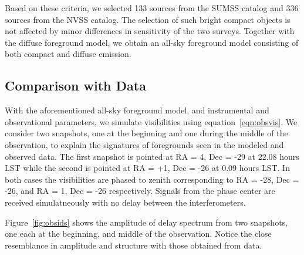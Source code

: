 \documentclass[preprint2,iop,numberedappendix]{emulateapj}
\begin{document}
Based on these criteria, we selected 133 sources from the SUMSS catalog and 336 sources from the NVSS catalog. The selection of such bright compact objects is not affected by minor differences in sensitivity of the two surveys. Together with the diffuse foreground model, we obtain an all-sky foreground model consisting of both compact and diffuse emission.

\subsection{Comparison with Data}\label{sec:data-vs-model}

With the aforementioned all-sky foreground model, and instrumental and observational parameters, we simulate visibilities using equation~\ref{eqn:obsvis}. We consider two snapshots, one at the beginning and one during the middle of the observation, to explain the signatures of foregrounds seen in the modeled and observed data. The first snapshot is pointed at RA = 4, Dec = -29 at 22.08 hours LST while the second is pointed at RA = +1, Dec = -26 at 0.09 hours LST. In both cases the visibilities are phased to zenith corresponding to RA = -28, Dec = -26, and RA = 1, Dec = -26 respectively. Signals from the phase center are received simulatneously with no delay between the interferometers. 

Figure~\ref{fig:obsids} shows the amplitude of delay spectrum from two snapshots, one each at the beginning, and middle of the observation. Notice the close resemblance in amplitude and structure with those obtained from data.
\end{document}
